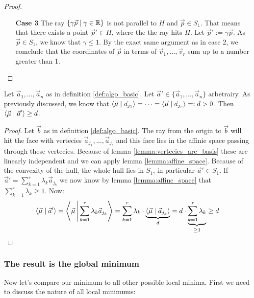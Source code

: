 \begin{proof}
\begin{itemize}
        \item[\textbf{Case 3}] The ray $\{\gamma\vec p\mid \gamma \in \mathbb{R}\}$ is not parallel to $H$ and $\vec p \in S_1$. That means that there exists a point $\vec p' \in H$, where the the ray hits $H$. Let $\vec p' := \gamma \vec p$. As $\vec p \in S_1$, we know that $\gamma \leq 1$. By the exact same argument as in case 2, we comclude that the coordinates of $\vec p$ in terms of $\vec v_1, \dots, \vec v_r$ sum up to a number greater than 1.
    \end{itemize}
\end{proof}

\begin{lemma}
    Let $\vec a_1, \dots, \vec a_n$ as in definition \ref{def:algo_basic}. Let $\vec a' \in \{\vec a_1, \dots, \vec a_n\}$ arbetrairy. As previously discussed, we know that $\langle \vec\mu \mid \vec a_{j_1} \rangle = \dots = \langle \vec\mu \mid \vec a_{j_r} \rangle =: d > 0$. Then $\langle \vec\mu \mid \vec a' \rangle \geq d$.
\end{lemma}
\begin{proof}
    Let $\vec b$ as in definition \ref{def:algo_basic}. The ray from the origin to $\vec b$ will hit the face with vertecies $\vec a_{j_1}, \dots, \vec a_{j_r}$ and this face lies in the affinie space passing through these vertecies. Because of lemma \ref{lemma:vertecies_are_basis} these are linearly independent and we can apply lemma \ref{lemma:affine_space}. Because of the convexity of the hull, the whole hull lies in $S_1$, in particular $\vec a' \in S_1$. If $\vec a' = \sum_{k=1}^r \lambda_k \vec a_{j_k}$ we now know by lemma \ref{lemma:affine_space} that $\sum_{k=1}^r \lambda_k \geq 1$. Now:
    $$\langle \vec\mu \mid \vec a' \rangle = \left\langle \vec\mu \,\middle|\, \sum_{k=1}^r \lambda_k \vec a_{j_k} \right\rangle = \sum_{k=1}^r\lambda_k \cdot \underbrace{\langle \vec\mu \mid \vec a_{j_k} \rangle}_d = d\cdot \underbrace{\sum_{k=1}^r\lambda_k}_{\geq 1} \geq d$$
\end{proof}

\subsubsection{The result is the global minimum}
Now let's compare our minimum to all other possible local minima. First we need to discuss the nature of all local minimums:


